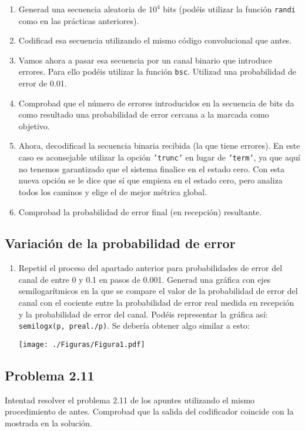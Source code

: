 \documentclass[es,practica,12pt]{uah}
\begin{document}
	\begin{enumerate}
		\item Generad una secuencia aleatoria de $10^4$ bits (podéis utilizar la función \texttt{randi} como en las prácticas anteriores).
		\item Codificad esa secuencia utilizando el mismo código convolucional que antes.
		\item Vamos ahora a pasar esa secuencia por un canal binario que introduce errores. Para ello podéis utilizar la función \texttt{bsc}. Utilizad una probabilidad de error de 0.01.
		\item Comprobad que el número de errores introducidos en la secuencia de bits da como resultado una probabilidad de error cercana a la marcada como objetivo.
		\item Ahora, decodificad la secuencia binaria recibida (la que tiene errores). En este caso es aconsejable utilizar la opción \texttt{'trunc'} en lugar de \texttt{'term'}, ya que aquí no tenemos garantizado que el sistema finalice en el estado cero. Con esta nueva opción se le dice que sí que empieza en el estado cero, pero analiza todos los caminos y elige el de mejor métrica global. 
		\item Comprobad la probabilidad de error final (en recepción) resultante. 
	\end{enumerate}

\subsection{Variación de la probabilidad de error}
	\begin{enumerate}
		\item Repetid el proceso del apartado anterior para probabilidades de error del canal de entre 0 y 0.1 en pasos de 0.001. Generad una gráfica con ejes semilogarítmicos en la que se compare el valor de la probabilidad de error del canal con el cociente entre la probabilidad de error real medida en recepción y la probabilidad de error del canal. Podéis representar la gráfica así: \texttt{semilogx(p, preal./p)}. Se debería obtener algo similar a esto:
		
		\centering\texttt{[image: ./Figuras/Figura1.pdf]}
	\end{enumerate}


\subsection{Problema 2.11}
Intentad resolver el problema 2.11 de los apuntes utilizando el mismo procedimiento de antes. Comprobad que la salida del codificador coincide con la mostrada en la solución. 
\end{document}
